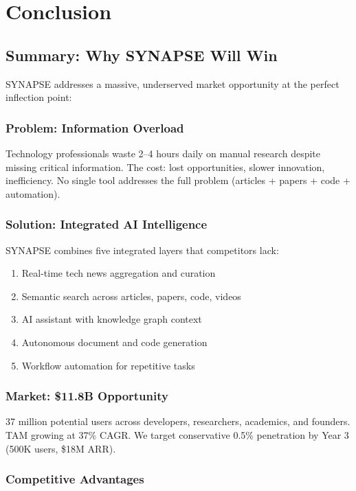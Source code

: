 \documentclass{report}
\begin{document}
\newpage

\chapter{Conclusion}

\section{Summary: Why SYNAPSE Will Win}

SYNAPSE addresses a massive, underserved market opportunity at the perfect inflection point:

\subsection{Problem: Information Overload}

Technology professionals waste 2--4 hours daily on manual research despite missing critical information. The cost: lost opportunities, slower innovation, inefficiency. No single tool addresses the full problem (articles + papers + code + automation).

\subsection{Solution: Integrated AI Intelligence}

SYNAPSE combines five integrated layers that competitors lack:
\begin{enumerate}
    \item Real-time tech news aggregation and curation
    \item Semantic search across articles, papers, code, videos
    \item AI assistant with knowledge graph context
    \item Autonomous document and code generation
    \item Workflow automation for repetitive tasks
\end{enumerate}

\subsection{Market: \$11.8B Opportunity}

37 million potential users across developers, researchers, academics, and founders. TAM growing at 37\% CAGR. We target conservative 0.5\% penetration by Year 3 (500K users, \$18M ARR).

\subsection{Competitive Advantages}
\end{document}
